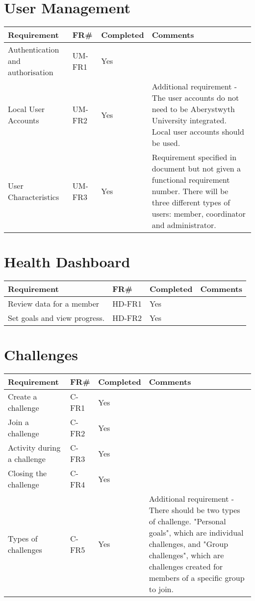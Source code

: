 \section{User Management}
\begin{tabular}{ |p{5cm}|l|l|p{8cm}|}
\hline
\textbf{Requirement}	&	\textbf{FR\#}	&	\textbf{Completed}	&	\textbf{Comments} \\
\hline
Authentication and authorisation 					& UM-FR1 	& Yes 		&  \\
\hline
Local User Accounts 								& UM-FR2 	& Yes 		& Additional requirement - The user accounts do not need to be Aberystwyth University integrated. Local user accounts should be used. \\
\hline
User Characteristics								& UM-FR3	& Yes		& Requirement specified in document but not given a functional requirement number. There will be three different types of users: member, coordinator and administrator. \\

\hline
\end{tabular}



\section{Health Dashboard}
\begin{tabular}{ |p{5cm}|l|l|p{8cm}|}
\hline
\textbf{Requirement}	&	\textbf{FR\#}	&	\textbf{Completed}	&	\textbf{Comments} \\
\hline
Review data for a member 							& HD-FR1 	& Yes 		&  \\
\hline
Set goals and view progress. 						& HD-FR2 	& Yes		&  \\

\hline
\end{tabular}


\section{Challenges}
\begin{tabular}{ |p{5cm}|l|l|p{8cm}|}
\hline
\textbf{Requirement}	&	\textbf{FR\#}	&	\textbf{Completed}	&	\textbf{Comments} \\
\hline
Create a challenge 									& C-FR1 	& Yes 		&  \\
\hline
Join a challenge 									& C-FR2 	& Yes  		&  \\
\hline
Activity during a challenge							& C-FR3 	& Yes 		&  \\
\hline
Closing the challenge								& C-FR4		& Yes 		&  \\
\hline
Types of challenges 								& C-FR5 	& Yes		& Additional requirement - There should be two types of challenge. "Personal goals", which are individual challenges, and "Group challenges", which are challenges created for members of a specific group to join. \\

\hline
\end{tabular}


